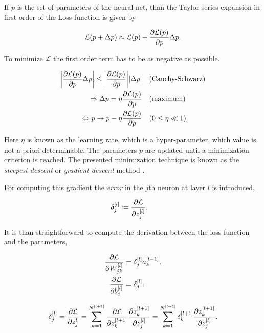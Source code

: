\documentclass[12pt, a4paper]{thesis}
\begin{document}
If \(p\) is the set of parameters of the neural net, than the Taylor
series expansion in first order of the Loss function is given by

\begin{align}
  \mathcal{L}(p + \Delta p) \approx \mathcal{L}(p) + \pdv{\mathcal{L}(p)}{p} \Delta p.
\end{align}

To minimize \(\mathcal{L}\) the first order term has to be as negative
as possible.

\begin{align}
  \abs{\pdv{\mathcal{L}(p)}{p} \Delta p} \leq \abs{\pdv{\mathcal{L}(p)}{p}} \abs{\Delta p} \quad &(\text{Cauchy-Schwarz}) \\
  \Rightarrow \Delta p = \eta \pdv{\mathcal{L}(p)}{p} \quad &(\text{maximum})\\
  \Leftrightarrow p \rightarrow p - \eta \pdv{\mathcal{L}(p)}{p} \quad &(0 \leq \eta \ll 1).
\end{align}

Here \(\eta\) is known as the learning rate, which is a
hyper-parameter, which value is not a priori determinable. The
parameters \(p\) are updated until a minimization criterion is
reached. The presented minimization technique is known as the
\emph{steepest descent} or \emph{gradient descent} method
\cite{cauchy}.

For computing this gradient the \emph{error} in the \(j\text{th}\)
neuron at layer \(l\) is introduced,

\begin{align}
  \delta^{[l]}_{j}  &\coloneqq \pdv{\mathcal{L}}{z^{[l]}_{j}}.
\end{align}

It is than straightforward to compute the derivation between the loss
function and the parameters,

\begin{align}
  \pdv{\mathcal{L}}{W^{[l]}_{jk}} &= \delta^{[l]}_{j} a_{k}^{[l-1]}, \\
  \pdv{\mathcal{L}}{b^{[l]}_{j}} &= \delta^{[l]}_{j}.
\end{align}

\begin{align}
  \delta^{[l]}_{j} = \pdv{\mathcal{L}}{z^{l}_{j}} =
  \sum^{N^{[l+1]}}_{k=1}
  \pdv{\mathcal{L}}{z_{k}^{[l+1]}}\pdv{{z_{k}^{[l+1]}}}{z_{j}^{[l]}} =
  \sum^{N^{[l+1]}}_{k=1} \delta^{[l+1]}_{k}
  \pdv{{z_{k}^{[l+1]}}}{z_{j}^{[l]}} \label{error-prop}.
\end{align}
\end{document}
